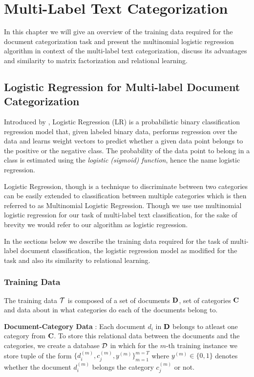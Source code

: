 \chapter{Multi-Label Text Categorization}
\label{chapter:mltextcat}
In this chapter we will give an overview of the training data required for the document categorization task and present the multinomial logistic regression algorithm in context of the multi-label text categorization, discuss its advantages and similarity to matrix factorization and relational learning.

\section{Logistic Regression for Multi-label Document Categorization}
\label{sec:lrtc}
Introduced by \citep{hosmer1989applied}, Logistic Regression (LR) is a probabilistic binary classification regression model that, given labeled binary data, performs regression over the data and learns weight vectors to predict whether a given data point belongs to the positive or the negative class. 
The probability of the data point to belong in a class is estimated using the \emph{logistic (sigmoid) function}, hence the name logistic regression.

Logistic Regression, though is a technique to discriminate between two categories can be easily extended to classification between multiple categories which is then referred to as Multinomial Logistic Regression. 
Though we use use multinomial logistic regression for our task of multi-label text classification, for the sake of brevity we would refer to our algorithm as logistic regression.\

In the sections below we describe the training data required for the task of multi-label document classification, the logistic regression model as modified for the task and also its similarity to relational learning.

\subsection{Training Data}
\label{sec:trdata_lr}
The training data $\mathcal{T}$ is composed of a set of documents $\mathbf{D}$, set of categories $\mathbf{C}$ and data about in what categories do each of the documents belong to. 

\textbf{Document-Category Data} : 
Each document $d_{i}$ in $\mathbf{D}$ belongs to atleast one category from $\mathbf{C}$. To store this relational data between the documents and the categories, we create a database $\mathcal{D}$ in which for the $m$-th training instance we store tuple of the form $\{ d^{(m)}_{i}, c^{(m)}_{j}, y^{(m)}\}^{m=T}_{m=1}$ where $y^{(m)} \in \{0, 1\}$ denotes whether the document $d^{(m)}_{i}$ belongs the category $c^{(m)}_{j}$ or not. 

